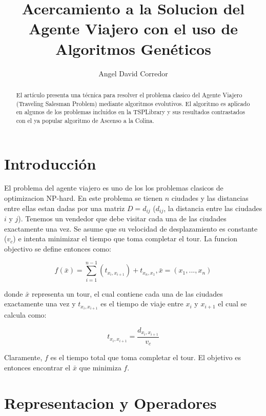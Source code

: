\documentclass[twocolumn]{IEEEtran}
\begin{document}
\title{Acercamiento a la Solucion del Agente Viajero con el uso de Algoritmos Genéticos}
\author{Angel David Corredor}
\date{}
\maketitle

\begin{abstract}
    El artículo presenta una técnica para resolver el problema clasico del Agente Viajero
    (Traveling Salesman Problem) mediante algoritmos evolutivos. El algoritmo es aplicado en
    algunos de los problemas incluidos en la TSPLibrary y sus resultados contrastados con el ya
    popular algoritmo de Ascenso a la Colina.     
\end{abstract}

\section{Introducción}

El problema del agente viajero es uno de los los problemas clasicos de optimizacion NP-hard.
En este problema se tienen $n$ ciudades y las distancias entre ellas estan dadas por una matriz
$D=d_{ij}$ ($d_{ij}$, la distancia entre las ciudades $i$ y $j$).
Tenemos un vendedor que debe visitar cada una de las ciudades exactamente una vez. Se asume que 
su velocidad de desplazamiento es constante ($v_c$) e intenta minimizar el tiempo que toma completar
el tour.
La funcion objectivo se define entonces como:

\begin{equation}
    f(\bar{x}) =
    \sum_{i=1}^{n-1} (t_{x_i,x_{i+1}})
    + t_{x_n,x_1},
    \bar{x}=(x_1,...,x_n)
\end{equation}

donde $\bar{x}$ representa un tour, el cual contiene cada una de las ciudades exactamente una vez
y $t_{x_i,x_{i+1}}$ es el tiempo de viaje entre $x_i$ y $x_{i+1}$ el cual se calcula como:

\begin{equation}
    t_{x_i,x_{i+1}} =
    \frac{d_{x_i,x_{i+1}}}{v_c}
\end{equation}

Claramente, $f$ es el tiempo total que toma completar el tour.
El objetivo es entonces encontrar el $\bar{x}$ que minimiza $f$. 

\section{Representacion y Operadores}
\end{document}
